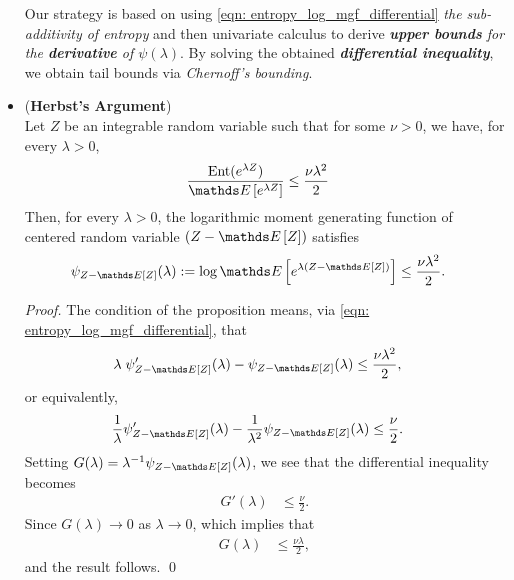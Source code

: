 \documentclass[11pt]{article}
\begin{document}
\begin{itemize}
\begin{remark}
Our strategy is based on using \eqref{eqn: entropy_log_mgf_differential} \emph{the sub-additivity of entropy} and then univariate calculus to derive \emph{\textbf{upper bounds} for the \textbf{derivative} of $\psi(\lambda)$}. By solving the obtained \emph{\textbf{differential inequality}}, we obtain tail bounds via \emph{Chernoff's bounding}.
\end{remark}

\item \begin{proposition} (\textbf{Herbst's Argument}) \citep{boucheron2013concentration, wainwright2019high}\\
Let $Z$ be an integrable random variable such that for some $\nu > 0$, we have, for every $\lambda > 0$,
\begin{align}
\frac{\text{Ent}(e^{\lambda Z})}{\E{}{e^{\lambda Z}}} &\le \frac{\nu \lambda^2}{2} \label{ineqn: herbst_argument}
\end{align} Then, for every $\lambda >0$, the logarithmic moment generating function of centered random variable $(Z - \E{}{Z})$ satisfies
\begin{align*}
\psi_{Z - \E{}{Z}}(\lambda) := \log\E{}{e^{\lambda (Z - \E{}{Z})}} &\le \frac{\nu \lambda^2}{2} .
\end{align*}
\end{proposition}
\begin{proof}
The condition of the proposition means, via \eqref{eqn: entropy_log_mgf_differential}, that
\begin{align*}
\lambda\; \psi_{Z - \E{}{Z}}'(\lambda) - \psi_{Z - \E{}{Z}}(\lambda) &\le \frac{\nu \lambda^2}{2},
\end{align*} or equivalently,
\begin{align*}
\frac{1}{\lambda}\psi_{Z - \E{}{Z}}'(\lambda) - \frac{1}{\lambda^2}\psi_{Z - \E{}{Z}}(\lambda) &\le \frac{\nu}{2}.
\end{align*} Setting $G(\lambda) = \lambda^{-1}\psi_{Z - \E{}{Z}}(\lambda)$, we see that the differential inequality becomes
\begin{align*}
G'(\lambda) &\le \frac{\nu}{2}.
\end{align*} Since $G(\lambda) \to 0$ as $\lambda \to 0$, which implies that
\begin{align*}
G(\lambda) &\le \frac{\nu \lambda}{2},
\end{align*} and the result follows. \qed
\end{proof}


\end{itemize}
\end{document}
